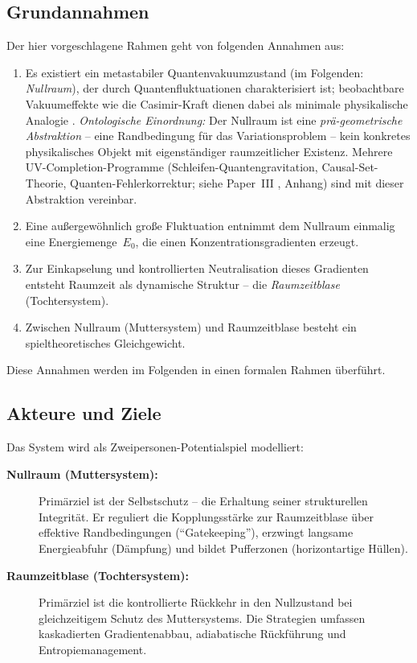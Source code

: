 \documentclass[aps,prd,twocolumn,superscriptaddress,nofootinbib]{revtex4-2}
\begin{document}
\subsection{Grundannahmen}
\label{subsec:grundannahmen}

Der hier vorgeschlagene Rahmen geht von folgenden Annahmen aus:

\begin{enumerate}
\item Es existiert ein metastabiler Quantenvakuumzustand (im Folgenden: \textit{Nullraum}), der durch Quantenfluktuationen charakterisiert ist; beobachtbare Vakuumeffekte wie die Casimir-Kraft dienen dabei als minimale physikalische Analogie \cite{Casimir1948}. \textit{Ontologische Einordnung:} Der Nullraum ist eine \emph{pr\"a-geometrische Abstraktion} -- eine Randbedingung f\"ur das Variationsproblem -- kein konkretes physikalisches Objekt mit eigenst\"andiger raumzeitlicher Existenz. Mehrere UV-Completion-Programme (Schleifen-Quantengravitation, Causal-Set-Theorie, Quanten-Fehlerkorrektur; siehe Paper~III \cite{Geiger2026c}, Anhang) sind mit dieser Abstraktion vereinbar.
\item Eine au\ss{}ergew\"ohnlich gro\ss{}e Fluktuation entnimmt dem Nullraum einmalig eine Energiemenge~$E_0$, die einen Konzentrationsgradienten erzeugt.
\item Zur Einkapselung und kontrollierten Neutralisation dieses Gradienten entsteht Raumzeit als dynamische Struktur -- die \textit{Raumzeitblase} (Tochtersystem).
\item Zwischen Nullraum (Muttersystem) und Raumzeitblase besteht ein spieltheoretisches Gleichgewicht.
\end{enumerate}

Diese Annahmen werden im Folgenden in einen formalen Rahmen \"uberf\"uhrt.

\subsection{Akteure und Ziele}
\label{subsec:akteure}

Das System wird als Zweipersonen-Potentialspiel modelliert:

\begin{description}
\item[\textbf{Nullraum (Muttersystem):}] Prim\"arziel ist der Selbstschutz -- die Erhaltung seiner strukturellen Integrit\"at. Er reguliert die Kopplungsst\"arke zur Raumzeitblase \"uber effektive Randbedingungen (``Gatekeeping''), erzwingt langsame Energieabfuhr (D\"ampfung) und bildet Pufferzonen (horizontartige H\"ullen).
\item[\textbf{Raumzeitblase (Tochtersystem):}] Prim\"arziel ist die kontrollierte R\"uckkehr in den Nullzustand bei gleichzeitigem Schutz des Muttersystems. Die Strategien umfassen kaskadierten Gradientenabbau, adiabatische R\"uckf\"uhrung und Entropiemanagement.
\end{description}
\end{document}
